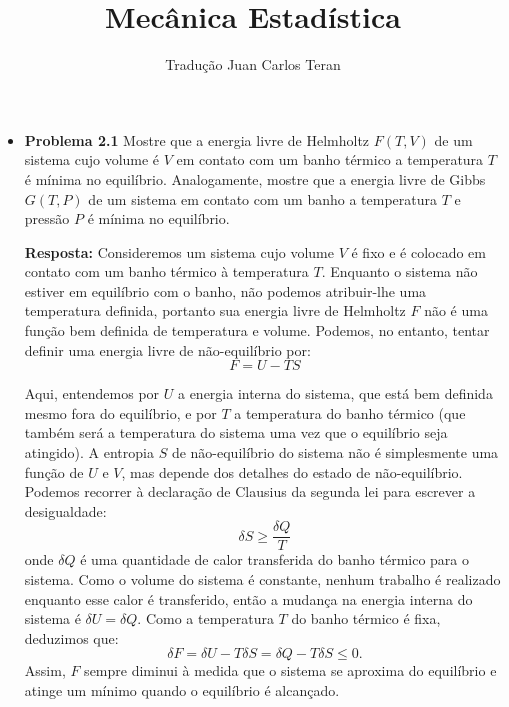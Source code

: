 \documentclass[12pt]{article}
\begin{document}
\medskip
\author{Tradução Juan Carlos Teran}
\title{Mecânica Estadística}
\maketitle

 \begin{itemize}
     \item \textbf{Problema 2.1} Mostre que a energia livre de Helmholtz $F(T, V)$ de um sistema cujo volume é $V$ em contato com um banho térmico a temperatura $T$ é mínima no equilíbrio. Analogamente, mostre que a energia livre de Gibbs $G(T, P)$ de um sistema em contato com um banho a temperatura $T$ e pressão $P$ é mínima no equilíbrio.

     \textbf{Resposta:}
     Consideremos um sistema cujo volume $V$ é fixo e é colocado em contato com um banho térmico à temperatura $T$. Enquanto o sistema não estiver em equilíbrio com o banho, não podemos atribuir-lhe uma temperatura definida, portanto sua energia livre de Helmholtz $F$ não é uma função bem definida de temperatura e volume. Podemos, no entanto, tentar definir uma energia livre de não-equilíbrio por:
     \begin{equation*}
         F = U - TS
     \end{equation*}
     
     Aqui, entendemos por $U$ a energia interna do sistema, que está bem definida mesmo fora do equilíbrio, e por $T$ a temperatura do banho térmico (que também será a temperatura do sistema uma vez que o equilíbrio seja atingido). A entropia $S$ de não-equilíbrio do sistema não é simplesmente uma função de $U$ e $V$, mas depende dos detalhes do estado de não-equilíbrio. Podemos recorrer à declaração de Clausius da segunda lei para escrever a desigualdade:
     \begin{equation}
         \delta S \geq \frac{\delta Q}{T}
     \end{equation}
     onde $\delta Q$ é uma quantidade de calor transferida do banho térmico para o sistema. Como o volume do sistema é constante, nenhum trabalho é realizado enquanto esse calor é transferido, então a mudança na energia interna do sistema é $\delta U = \delta Q$. Como a temperatura $T$ do banho térmico é fixa, deduzimos que:
     \begin{equation}
         \delta F = \delta U - T \delta S = \delta Q - T \delta S \leq 0.
     \end{equation}
     Assim, $F$ sempre diminui à medida que o sistema se aproxima do equilíbrio e atinge um mínimo quando o equilíbrio é alcançado.
    

\end{itemize}
\end{document}
